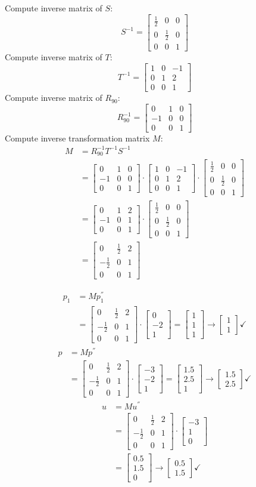 \documentclass[tikz,14pt,fleqn]{article}
\newcommand{\bmat}[1]{
   \ensuremath{
   \begin{bmatrix}
       #1
   \end{bmatrix}
}}
\begin{document}
Compute inverse matrix of $S$:
\[
S^{-1} = \begin{bmatrix}
\frac{1}{2} & 0 & 0\\
0 & \frac{1}{2} & 0\\
0 & 0 & 1
\end{bmatrix}
\]
Compute inverse matrix of $T$:
\[
T^{-1} = \bmat{
1 & 0 & -1\\ 
0 & 1 & 2\\
0 & 0 & 1
}
\]
Compute inverse matrix of $R_{90}$:
\[
R_{90}^{-1} = \bmat{
0 & 1 & 0\\ 
-1 & 0 & 0\\
0 & 0 & 1
}
\]
Compute inverse transformation matrix $M$:
\begin{align*}
M &= R_{90}^{-1} T^{-1} S^{-1} \\
&=\bmat{
0 & 1 & 0\\ 
-1 & 0 & 0\\
0 & 0 & 1
}\cdot\bmat{
1&0&-1\\
0&1&2\\
0&0&1
}\cdot\bmat{
\frac{1}{2}&0&0\\
0&\frac{1}{2}&0\\
0&0&1} \\
&= \bmat{0&1&2\\ -1&0&1\\ 0&0&1}\cdot \bmat{\frac{1}{2}&0&0\\ 0&\frac{1}{2}&0\\ 0&0&1}\\
&= \bmat{0&\frac{1}{2}&2\\ -\frac{1}{2}&0&1\\ 0&0&1}
\end{align*}

\newcommand{\M}[0]{
\bmat{0&\frac{1}{2}&2\\ -\frac{1}{2}&0&1\\ 0&0&1}
}


\begin{align*}
p_1 &= M p_{1}^{''}\\
&= \M \cdot \bmat{0\\-2\\1} = \bmat{1\\ 1\\ 1}\rightarrow \bmat{1\\1}\checkmark
\end{align*} 
\begin{align*}
p &= M p^{''}\\
&= \M \cdot \bmat{-3\\-2\\1} = \bmat{1.5\\2.5\\1}\rightarrow \bmat{1.5\\2.5}\checkmark
\end{align*} 
\begin{align*}
u &= M u^{''}\\
&= \M \cdot \bmat{-3\\1\\0}\\
&= \bmat{0.5\\1.5\\0} \rightarrow \bmat{0.5\\1.5}\checkmark
\end{align*} 
\end{document}
